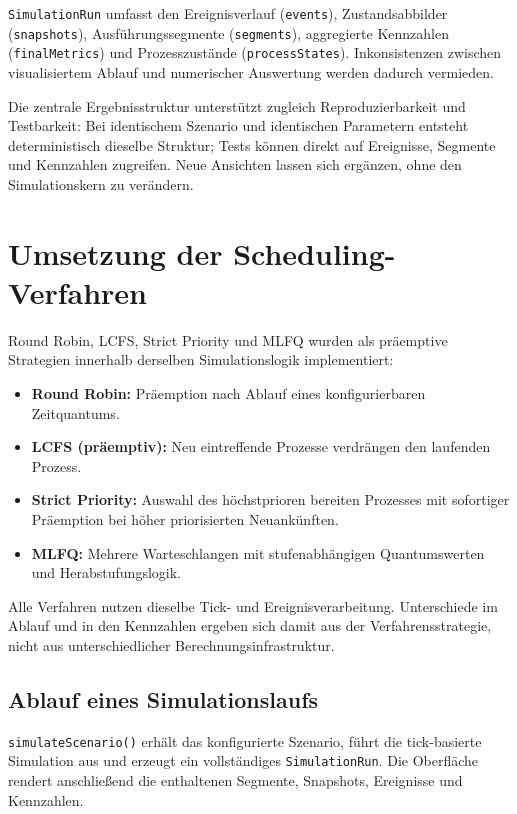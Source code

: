 \texttt{SimulationRun} umfasst den Ereignisverlauf (\texttt{events}), Zustandsabbilder (\texttt{snapshots}), Ausführungssegmente (\texttt{segments}), aggregierte Kennzahlen (\texttt{finalMetrics}) und Prozesszustände (\texttt{processStates}). Inkonsistenzen zwischen visualisiertem Ablauf und numerischer Auswertung werden dadurch vermieden.

Die zentrale Ergebnisstruktur unterstützt zugleich Reproduzierbarkeit und Testbarkeit: Bei identischem Szenario und identischen Parametern entsteht deterministisch dieselbe Struktur; Tests können direkt auf Ereignisse, Segmente und Kennzahlen zugreifen. Neue Ansichten lassen sich ergänzen, ohne den Simulationskern zu verändern.

\section{Umsetzung der Scheduling-Verfahren}

Round Robin, LCFS, Strict Priority und MLFQ wurden als präemptive Strategien innerhalb derselben Simulationslogik implementiert:

\begin{itemize}
    \item \textbf{Round Robin:} Präemption nach Ablauf eines konfigurierbaren Zeitquantums.
    \item \textbf{LCFS (präemptiv):} Neu eintreffende Prozesse verdrängen den laufenden Prozess.
    \item \textbf{Strict Priority:} Auswahl des höchstprioren bereiten Prozesses mit sofortiger Präemption bei höher priorisierten Neuankünften.
    \item \textbf{MLFQ:} Mehrere Warteschlangen mit stufenabhängigen Quantumswerten und Herabstufungslogik.
\end{itemize}

Alle Verfahren nutzen dieselbe Tick- und Ereignisverarbeitung. Unterschiede im Ablauf und in den Kennzahlen ergeben sich damit aus der Verfahrensstrategie, nicht aus unterschiedlicher Berechnungsinfrastruktur.

\subsection{Ablauf eines Simulationslaufs}

\texttt{simulateScenario()} erhält das konfigurierte Szenario, führt die tick-basierte Simulation aus und erzeugt ein vollständiges \texttt{SimulationRun}. Die Oberfläche rendert anschließend die enthaltenen Segmente, Snapshots, Ereignisse und Kennzahlen.

